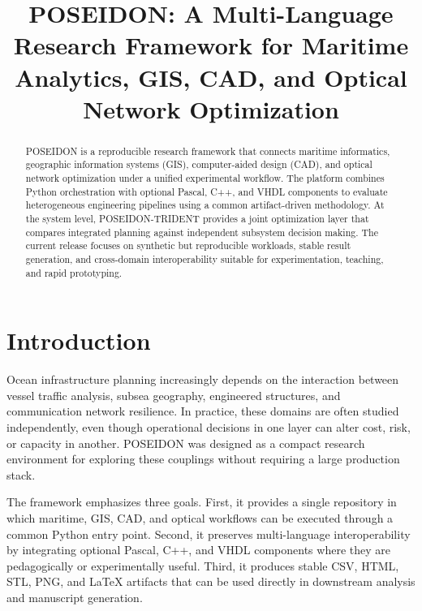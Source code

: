 \documentclass[conference]{IEEEtran}
\title{POSEIDON: A Multi-Language Research Framework for Maritime Analytics, GIS, CAD, and Optical Network Optimization}
\author{\IEEEauthorblockN{George David Tsitlauri}
\IEEEauthorblockA{\textit{Dept. of Informatics \& Telecommunications}\\
\textit{University of Thessaly, Greece}\\
gdtsitlauri@gmail.com}}
\begin{document}
\maketitle

\begin{abstract}
POSEIDON is a reproducible research framework that connects maritime informatics, geographic information systems (GIS), computer-aided design (CAD), and optical network optimization under a unified experimental workflow. The platform combines Python orchestration with optional Pascal, C++, and VHDL components to evaluate heterogeneous engineering pipelines using a common artifact-driven methodology. At the system level, POSEIDON-TRIDENT provides a joint optimization layer that compares integrated planning against independent subsystem decision making. The current release focuses on synthetic but reproducible workloads, stable result generation, and cross-domain interoperability suitable for experimentation, teaching, and rapid prototyping.
\end{abstract}

\section{Introduction}
Ocean infrastructure planning increasingly depends on the interaction between vessel traffic analysis, subsea geography, engineered structures, and communication network resilience. In practice, these domains are often studied independently, even though operational decisions in one layer can alter cost, risk, or capacity in another. POSEIDON was designed as a compact research environment for exploring these couplings without requiring a large production stack.

The framework emphasizes three goals. First, it provides a single repository in which maritime, GIS, CAD, and optical workflows can be executed through a common Python entry point. Second, it preserves multi-language interoperability by integrating optional Pascal, C++, and VHDL components where they are pedagogically or experimentally useful. Third, it produces stable CSV, HTML, STL, PNG, and LaTeX artifacts that can be used directly in downstream analysis and manuscript generation.
\end{document}
